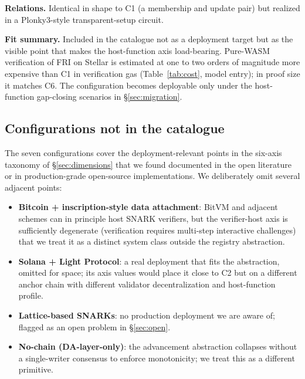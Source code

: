 \textbf{Relations.} Identical in shape to C1 (a membership and update
pair) but realized in a Plonky3-style transparent-setup circuit.

\textbf{Fit summary.} Included in the catalogue not as a deployment
target but as the visible point that makes the host-function axis
load-bearing. Pure-WASM verification of FRI on Stellar is estimated
at one to two orders of magnitude more expensive than C1 in
verification gas (Table~\ref{tab:cost}, model entry); in proof size
it matches C6. The configuration becomes deployable only under the
host-function gap-closing scenarios in
\S\ref{sec:migration}.

\subsection{Configurations not in the catalogue}

The seven configurations cover the deployment-relevant points in the
six-axis taxonomy of \S\ref{sec:dimensions} that we found documented
in the open literature or in production-grade open-source
implementations. We deliberately omit several adjacent points:

\begin{itemize}
  \item \textbf{Bitcoin + inscription-style data attachment}: BitVM
    and adjacent schemes can in principle host SNARK verifiers, but
    the verifier-host axis is sufficiently degenerate (verification
    requires multi-step interactive challenges) that we treat it as a
    distinct system class outside the registry abstraction.
  \item \textbf{Solana + Light Protocol}: a real deployment that
    fits the abstraction, omitted for space; its axis values would
    place it close to C2 but on a different anchor chain with
    different validator decentralization and host-function profile.
  \item \textbf{Lattice-based SNARKs}: no production deployment we
    are aware of; flagged as an open problem in \S\ref{sec:open}.
  \item \textbf{No-chain (DA-layer-only)}: the
    advancement abstraction collapses without a single-writer
    consensus to enforce monotonicity; we treat this as a different
    primitive.
\end{itemize}

